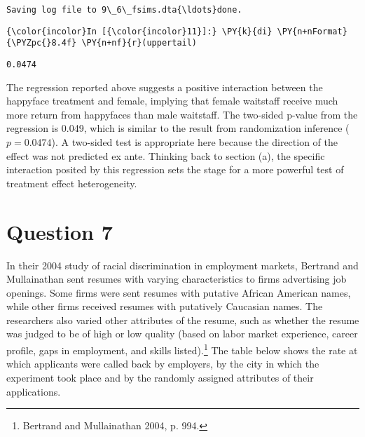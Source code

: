 \documentclass[11pt,notitlepage]{article}\usepackage[]{graphicx}\usepackage[]{color}
\makeatletter
\newenvironment{kframe}{%
 \def\at@end@of@kframe{}%
 \ifinner\ifhmode%
  \def\at@end@of@kframe{\end{minipage}}%
  \begin{minipage}{\columnwidth}%
 \fi\fi%
 \def\FrameCommand##1{\hskip\@totalleftmargin \hskip-\fboxsep
 \colorbox{shadecolor}{##1}\hskip-\fboxsep
     \hskip-\linewidth \hskip-\@totalleftmargin \hskip\columnwidth}%
 \MakeFramed {\advance\hsize-\width
   \@totalleftmargin\z@ \linewidth\hsize
   \@setminipage}}%
 {\par\unskip\endMakeFramed%
 \at@end@of@kframe}
\newenvironment{knitrout}{}{} %
\makeatother
\begin{document}
\begin{enumerate}[a)]
\begin{knitrout}
\begin{kframe}
\begin{Verbatim}[commandchars=\\\{\}]
Saving log file to 9\_6\_fsims.dta{\ldots}done.

    \end{Verbatim}

    \begin{Verbatim}[commandchars=\\\{\}]
{\color{incolor}In [{\color{incolor}11}]:} \PY{k}{di} \PY{n+nFormat}{\PYZpc{}8.4f} \PY{n+nf}{r}(uppertail)
\end{Verbatim}

    \begin{Verbatim}[commandchars=\\\{\}]
  0.0474

    \end{Verbatim}

\end{kframe}
\end{knitrout}
\end{enumerate}

The regression reported above suggests a positive interaction between the happyface treatment and female, implying that female waitstaff receive much more return from happyfaces than male waitstaff. The two-sided p-value from the regression is 0.049, which is similar to the result from randomization inference ($p=0.0474$).  A two-sided test is appropriate here because the direction of the effect was not predicted ex ante.  Thinking back to section (a), the specific interaction posited by this regression sets the stage for a more powerful test of treatment effect heterogeneity.

\section*{Question 7}
In their 2004 study of racial discrimination in employment markets, Bertrand and Mullainathan sent resumes with varying characteristics to firms advertising job openings. Some firms were sent resumes with putative African American names, while other firms received resumes with putatively Caucasian names. The researchers also varied other attributes of the resume, such as whether the resume was judged to be of high or low quality (based on labor market experience, career profile, gaps in employment, and skills listed).\footnote{Bertrand and Mullainathan 2004, p. 994.} The table below shows the rate at which applicants were called back by employers, by the city in which the experiment took place and by the randomly assigned attributes of their applications.
\end{document}
